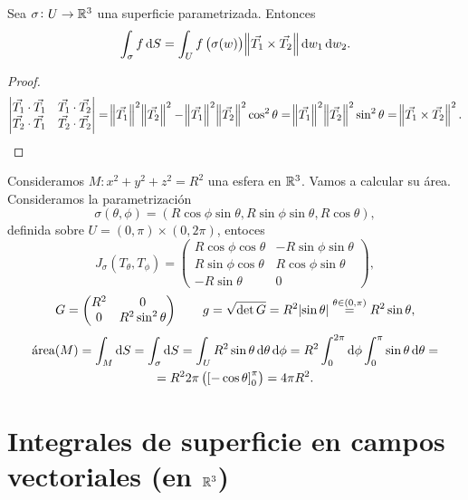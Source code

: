 \begin{lema}
    Sea $\sigma \colon U \to \mathbb{R}^3$ una superficie parametrizada. Entonces
    \[
        \int_\sigma f \dif S = \int_U f\left( \sigma(w) \right) \norm{\vec{T_1} \times \vec{T_2}} \dif w_1 \dif w_2.
    \]
\end{lema}

\begin{proof}
    \[
        \begin{vmatrix}\vec{T_1}\cdot \vec{T_1} & \vec{T_1} \cdot \vec{T_2} \\ \vec{T_2}\cdot\vec{T_1} & \vec{T_2}\cdot\vec{T_2}\end{vmatrix} =
        \norm{\vec{T_1}}^2 \norm{\vec{T_2}}^2 - \norm{\vec{T_1}}^2\norm{\vec{T_2}}^2 \cos^2 \theta = \norm{\vec{T_1}}^2\norm{\vec{T_2}}^2 \sin^2 \theta
        = \norm{\vec{T_1} \times \vec{T_2}}^2.
    \]
\end{proof}

\begin{example}
    Consideramos $M: x^2 + y^2 + z^2 = R^2$ una esfera en $\mathbb{R}^3$. Vamos a calcular su área. Consideramos la parametrización
    \[
        \sigma(\theta, \phi) = \left( R \cos \phi \sin \theta, R \sin\phi \sin \theta, R \cos \theta \right),
    \]
    definida sobre $U = (0,\pi) \times (0,2\pi)$, entoces
    \[
        J_\sigma\left( T_\theta, T_\phi \right) =
        \begin{pmatrix}
            R \cos \phi \cos \theta & - R \sin\phi\sin\theta \\
            R \sin \phi \cos \theta & R \cos\phi\sin\theta \\
            -R\sin\theta & 0
        \end{pmatrix},
    \]
    \[
        G =
        \begin{pmatrix}
            R^2 & 0 \\ 0 & R^2 \sin^2\theta
        \end{pmatrix}
        \qquad
        g = \sqrt{\det G} = R^2 \abs{\sin \theta} \stackrel{\theta \in (0,\pi)}{=} R^2 \sin \theta,
    \]
    \begin{gather*}
        \text{\'area}(M) = \int_M \dif S = \int_\sigma \dif S = \int_U R^2 \sin \theta \dif \theta \dif \phi = R^2 \int^{2\pi}_0 \dif\phi \int^\pi_0 \sin \theta \dif \theta = \\
        = R^2 2\pi \left( \left[ -\cos\theta \right]^\pi_0 \right) = 4\pi R^2.
    \end{gather*}
\end{example}

\section{Integrales de superficie en campos vectoriales (en $\mathbb{R}^3$)}

